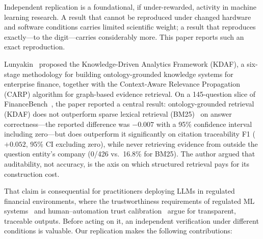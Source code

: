 \documentclass[11pt]{article}
\begin{document}
Independent replication is a foundational, if under-rewarded, activity in machine learning research. A result that cannot be reproduced under changed hardware and software conditions carries limited scientific weight; a result that reproduces exactly---to the digit---carries considerably more. This paper reports such an exact reproduction.

Lunyakin~\cite{lunyakin2026} proposed the Knowledge-Driven Analytics Framework (KDAF), a six-stage methodology for building ontology-grounded knowledge systems for enterprise finance, together with the Context-Aware Relevance Propagation (CARP) algorithm for graph-based evidence retrieval. On a 145-question slice of FinanceBench~\cite{islam2023}, the paper reported a central result: ontology-grounded retrieval (KDAF) does not outperform sparse lexical retrieval (BM25)~\cite{robertson2009} on answer correctness---the reported difference was $-0.007$ with a 95\% confidence interval including zero---but does outperform it significantly on citation traceability F1 ($+0.052$, 95\% CI excluding zero), while never retrieving evidence from outside the question entity's company (0/426 vs.\ 16.8\% for BM25). The author argued that auditability, not accuracy, is the axis on which structured retrieval pays for its construction cost.

That claim is consequential for practitioners deploying LLMs in regulated financial environments, where the trustworthiness requirements of regulated ML systems~\cite{sr117, nist_ai_rmf} and human--automation trust calibration~\cite{lee2004} argue for transparent, traceable outputs. Before acting on it, an independent verification under different conditions is valuable. Our replication makes the following contributions:
\end{document}

